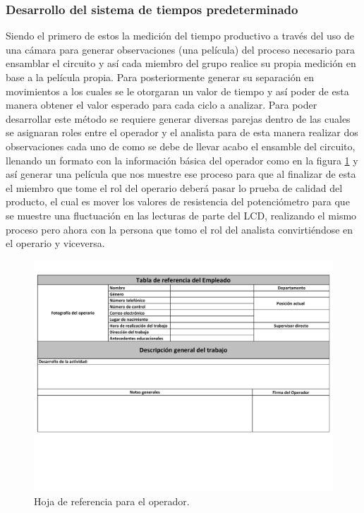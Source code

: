\subsubsection{Desarrollo del sistema de tiempos predeterminado}

        Siendo el primero de estos la medición del tiempo productivo a través del uso de una cámara para generar observaciones (una película) del proceso necesario para ensamblar el circuito y así cada miembro del grupo realice su propia medición en base a la película propia. Para posteriormente generar su separación en movimientos a los cuales se le otorgaran un valor de tiempo y así poder de esta manera obtener el valor esperado para cada ciclo a analizar. 
        Para poder desarrollar este método se requiere generar diversas parejas dentro de las cuales se asignaran roles entre el operador y el analista para de esta manera realizar dos observaciones cada uno de como se debe de llevar acabo el ensamble del circuito, llenando un formato con la información básica del operador como en la figura \ref{fig:tablaReferencia} y así generar una película que nos muestre ese proceso para que al finalizar de esta el miembro que tome el rol del operario deberá pasar lo prueba de calidad del producto, el cual es mover los valores de resistencia del potenciómetro para que se muestre una fluctuación en las lecturas de parte del LCD, realizando el mismo proceso pero ahora con la persona que tomo el rol del analista convirtiéndose en el operario y viceversa.
        \begin{figure}[H]
        \centering
        \includegraphics[trim = {1mm 50mm 1mm 1mm},clip,scale=0.3]{19/Img/tablaReferencia.pdf}
        \caption{Hoja de referencia para el operador.}
        \label{fig:tablaReferencia}
    \end{figure}
